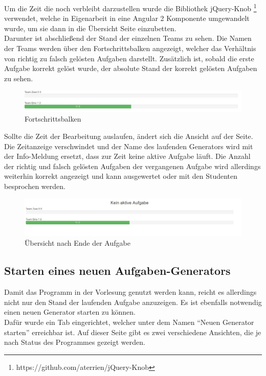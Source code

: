 Um die Zeit die noch verbleibt darzustellen wurde die Bibliothek jQuery-Knob \footnote{https://github.com/aterrien/jQuery-Knob} verwendet, welche in Eigenarbeit in eine Angular 2 Komponente umgewandelt wurde, um sie dann in die Übersicht Seite einzubetten. \\

Darunter ist abschließend der Stand der einzelnen Teams zu sehen. Die Namen der Teams werden über den Fortschrittsbalken angezeigt, welcher das Verhältnis von richtig zu falsch gelösten Aufgaben darstellt. Zusätzlich ist, sobald die erste Aufgabe korrekt gelöst wurde, der absolute Stand der korrekt gelösten Aufgaben zu sehen. \\

\begin{figure}[htp]     %
\centering
\includegraphics[width=1\textwidth]{bilder/Bars} 
\caption[Fortschrittsbalken]{Fortschrittsbalken}
\end{figure} 

Sollte die Zeit der Bearbeitung auslaufen, ändert sich die Ansicht auf der Seite. Die Zeitanzeige verschwindet und der Name des laufenden Generators wird mit der Info-Meldung ersetzt, dass zur Zeit keine aktive Aufgabe läuft. Die Anzahl der richtig und falsch gelösten Aufgaben der vergangenen Aufgabe wird allerdings weiterhin korrekt angezeigt und kann ausgewertet oder mit den Studenten besprochen werden.

\begin{figure}[htp]     %
\centering
\includegraphics[width=1\textwidth]{bilder/TaskOver} 
\caption[Übersicht nach Ende der Aufgabe]{Übersicht nach Ende der Aufgabe}
\end{figure} 


\subsection{Starten eines neuen Aufgaben-Generators}

Damit das Programm in der Vorlesung genutzt werden kann, reicht es allerdings nicht nur den Stand der laufenden Aufgabe anzuzeigen. Es ist ebenfalls notwendig einen neuen Generator starten zu können. \\
Dafür wurde ein Tab eingerichtet, welcher unter dem Namen ``Neuen Generator starten'' erreichbar ist.
Auf dieser Seite gibt es zwei verschiedene Ansichten, die je nach Status des Programmes gezeigt werden. \\

